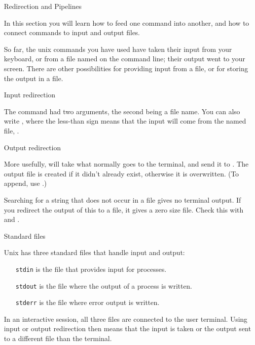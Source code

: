  {Redirection and Pipelines}
\label{sec:unixpipe}

\begin{purpose}
  In this section you will learn how to feed one command into another,
  and how to connect commands to input and output files.
\end{purpose}

So far, the unix commands you have used have taken their input from
your keyboard, or from a file named on the command line; their output
went to your screen. There are other possibilities for providing input
from a file, or for storing the output in a file.

 {Input redirection}

The  command had two arguments, the second being a file
name. You can also write , where the
less-than sign means that the input will come from the named file,
.

 {Output redirection}

More usefully,  will take what
normally goes to the terminal, and send it to . The output
file is created if it didn't already exist, otherwise it is
overwritten. (To append, use .)

{Searching for a
  string that does not occur in a file gives no terminal output. If
  you redirect the output of this  to a file, it gives a zero size
  file. Check this with  and .}{}

 {Standard files}

Unix has three standard files that handle input and output:
\begin{itemize}
\item [{\tt stdin}] is the file that provides input for processes.
\item [{\tt stdout}] is the file where the output of a process is
  written.
\item [{\tt stderr}] is the file where error output is written.
\end{itemize}
In an interactive session, all three files are connected to the user
terminal. Using input or output redirection then means that the input
is taken or the output sent to a different file than the terminal.

